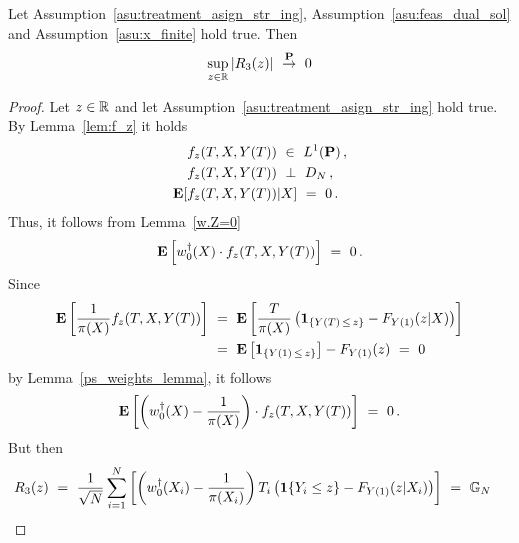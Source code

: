 \begin{lemma}
  \label{aa:mean:r3:lem:conv}
  Let Assumption~\eqref{asu:treatment_asign_str_ing}, Assumption~\ref{asu:feas_dual_sol} and Assumption~\ref{asu:x_finite} hold true.
  Then
  \begin{align*}
  \sup_{z\in\R}\left| R_3(z) \right|
  \ 
  \overset{\P}{\to}
  \ 
  0
  \end{align*}
\end{lemma}
\begin{proof}
  Let
  $z\in\mathbb{R}$
  and let Assumption~\eqref{asu:treatment_asign_str_ing} hold true.
    By Lemma~\ref{lem:f_z}
  it holds 
  \begin{align*}
    &
  f_z(T,X,Y(T))
  \ 
  \in
  \ 
  L^1(\P)\,, 
  \\
  &
  f_z(T,X,Y(T))
  \ 
  \perp
  \ 
  D_N
  \,,
  \\
  \E
  [
  &
  f_z(T,X,Y(T))
    |X
  ]
  \ 
  =
  \ 
  0
  \,.
  \end{align*}
  Thus, 
  it follows from Lemma~\ref{w.Z=0}
  \begin{gather*}
    \E
    \left[
      w_0^\dagger(X)
      \cdot
      f_z(T,X,Y(T))
    \right]
    \ 
    =
    \ 
    0
    \,.
  \end{gather*}
  Since
  \begin{align*}
    \E
    \left[
      \frac{1}{\pi(X)}
      f_z(T,X,Y(T))
    \right]
    &
    \ 
    =
    \ 
    \E
    \left[
      \frac{T}{\pi(X)}
      \left( 
        \mathbf{1}
        _{\left\{  Y(T)\,\le\,z \right\}}
        -
        F_{Y(1)}(z|X)
      \right)
    \right]
    \\
    &
    \ 
    =
    \ 
    \E \left[
        \mathbf{1}
        _{\left\{  Y(1)\,\le\,z \right\}}
    \right]
    -
        F_{Y(1)}(z)
    \  
    =
    \ 
    0
  \end{align*}
  by Lemma~\ref{ps_weights_lemma},
  it follows
  \begin{align*}
    \E
    \left[ 
      \left( 
      w_0^\dagger(X)
      -
      \frac{1}{\pi(X)}
      \right)
     \cdot
     f_z(T,X,Y(T))
    \right]
    \ 
    =
    \ 
  0
  \,.
  \end{align*}
  But then 
  \begin{align*}
    R_3(z)
    &
    \ 
    =
    \ 
  \frac{1}
  {
\sqrt{N}
  }
    \sum_{i=1}^{N} 
    \left[ 
    \left( 
    w_0^\dagger(X_i) 
    -
    \frac{1}{\pi(X_i)}
    \right)
    T_i
    \left( 
    \mathbf{1}{\left\{ Y_i \le z \right\}}
    -
  F_{Y(1)}(z|X_i)
    \right)
    \right]
    \ 
    =
    \ 
    \G_N

\end{align*}
\end{proof}
